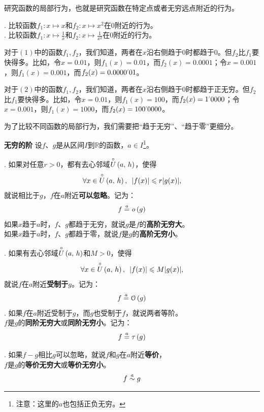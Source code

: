\documentclass[12pt,UTF8,fontset=none]{ctexbook}
\begin{document}
研究函数的局部行为，也就是研究函数在特定点或者无穷远点附近的行为。

\begin{ex}
    . 比较函数$f_1: x\mapsto x$和$f_2: x\mapsto x^2$在$0$附近的行为。\\
    . 比较函数$f_1: x\mapsto \frac{1}{x}$和$f_2: x\mapsto \frac{1}{x^2}$在$0$附近的行为。
\end{ex}

对于$(1)$中的函数$f_1,f_2$，我们知道，两者在$x$沿右侧趋于$0$时都趋于$0$。但$f_2$比$f_1$要快得多。比如，令$x=0.01$，则$f_1(x) = 0.01$，而$f_2(x) = 0.0001$；令$x=0.001$，则$f_1(x) = 0.001$，而$f_2(x) = 0.0000\dlim{01}$。

对于$(2)$中的函数$f_1,f_2$，我们知道，两者在$x$沿右侧趋于$0$时都趋于正无穷。但$f_2$比$f_1$要快得多。比如，令$x=0.01$，则$f_1(x) = 100$，而$f_2(x) = 1\dlim{0000}$；令$x=0.001$，则$f_1(x) = 1000$，而$f_2(x) = 100\dlim{0000}$。

为了比较不同函数的局部行为，我们需要把“趋于无穷”、“趋于零”更细分。

\begin{df}{\textbf{无穷的阶}}
    设$f$、$g$是从区间$I$到$\mathbb{R}$的函数，$a\in I$\footnote{注意：这里的$a$也包括正负无穷。}。

    . 如果对任意$r>0$，都有去心邻域$\overset{\circ}{U}\left(a,\,h\right)$，使得
    $$ \forall x \in \overset{\circ}{U}\left(a,\,h\right), \,\,\, |f(x)| \leqslant r |g(x)|,$$
    \indent 就说相比于$g$，$f$在$a$附近\textbf{可以忽略}。记为：
    $$ f \overset{a}{=} \mathit{o}\left(g\right)$$
    \indent 如果$x$趋于$a$时，$f$、$g$都趋于无穷，就说$g$是$f$的\textbf{高阶无穷大}。\\
    \indent 如果$x$趋于$a$时，$f$、$g$都趋于零，就说$f$是$g$的\textbf{高阶无穷小}。

    . 如果有去心邻域$\overset{\circ}{U}\left(a,\,h\right)$和$M > 0$，使得
    $$ \forall x \in \overset{\circ}{U}\left(a,\,h\right), \,\,\, |f(x)| \leqslant M |g(x)|,$$
    \indent 就说$f$在$a$附近\textbf{受制于}$g$。记为：
    $$ f \overset{a}{=} \mathcal{O}\left(g\right)$$
    . 如果$f$在$a$附近受制于$g$，而$g$也受制于$f$，就说两者等阶。\\
    \indent $f$是$g$的\textbf{同阶无穷大}或\textbf{同阶无穷小}。记为：
    $$ f \overset{a}{=} \tau\left(g\right)$$

    . 如果$f - g$相比$g$可以忽略，就说$f$和$g$在$a$附近\textbf{等价}，\\
    \indent $f$是$g$的\textbf{等价无穷大}或\textbf{等价无穷小}。
    $$ f \overset{a}{\sim} g$$

\end{df}
\end{document}
